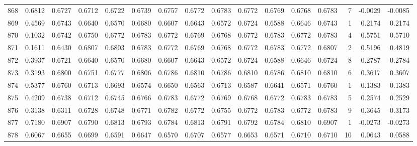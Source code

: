 \begin{tabular}{lrrrrrrrrrrrrrrr}
868 &      0.6812 &  0.6727 &  0.6712 &  0.6722 &  0.6739 &  0.6757 &  0.6772 &  0.6783 &  0.6772 &  0.6769 &   0.6768 &     0.6783 &      7 &                   -0.0029 &                    -0.0085 \\
869 &      0.4569 &  0.6743 &  0.6640 &  0.6570 &  0.6680 &  0.6607 &  0.6643 &  0.6572 &  0.6724 &  0.6588 &   0.6646 &     0.6743 &      1 &                    0.2174 &                     0.2174 \\
870 &      0.1032 &  0.6742 &  0.6750 &  0.6772 &  0.6783 &  0.6772 &  0.6769 &  0.6768 &  0.6772 &  0.6783 &   0.6772 &     0.6783 &      4 &                    0.5751 &                     0.5710 \\
871 &      0.1611 &  0.6430 &  0.6807 &  0.6803 &  0.6783 &  0.6772 &  0.6769 &  0.6768 &  0.6772 &  0.6783 &   0.6772 &     0.6807 &      2 &                    0.5196 &                     0.4819 \\
872 &      0.3937 &  0.6721 &  0.6640 &  0.6570 &  0.6680 &  0.6607 &  0.6643 &  0.6572 &  0.6724 &  0.6588 &   0.6646 &     0.6724 &      8 &                    0.2787 &                     0.2784 \\
873 &      0.3193 &  0.6800 &  0.6751 &  0.6777 &  0.6806 &  0.6786 &  0.6810 &  0.6786 &  0.6810 &  0.6786 &   0.6810 &     0.6810 &      6 &                    0.3617 &                     0.3607 \\
874 &      0.5377 &  0.6760 &  0.6713 &  0.6693 &  0.6574 &  0.6650 &  0.6563 &  0.6713 &  0.6587 &  0.6641 &   0.6571 &     0.6760 &      1 &                    0.1383 &                     0.1383 \\
875 &      0.4209 &  0.6738 &  0.6712 &  0.6745 &  0.6766 &  0.6783 &  0.6772 &  0.6769 &  0.6768 &  0.6772 &   0.6783 &     0.6783 &      5 &                    0.2574 &                     0.2529 \\
876 &      0.3138 &  0.6311 &  0.6728 &  0.6748 &  0.6771 &  0.6782 &  0.6772 &  0.6755 &  0.6772 &  0.6783 &   0.6772 &     0.6783 &      9 &                    0.3645 &                     0.3173 \\
877 &      0.7180 &  0.6907 &  0.6790 &  0.6813 &  0.6793 &  0.6784 &  0.6813 &  0.6791 &  0.6792 &  0.6784 &   0.6810 &     0.6907 &      1 &                   -0.0273 &                    -0.0273 \\
878 &      0.6067 &  0.6655 &  0.6699 &  0.6591 &  0.6647 &  0.6570 &  0.6707 &  0.6577 &  0.6653 &  0.6571 &   0.6710 &     0.6710 &     10 &                    0.0643 &                     0.0588 \\

\end{tabular}
